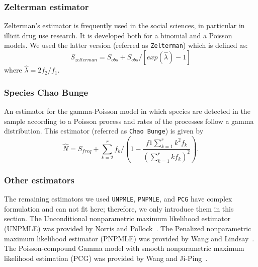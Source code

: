 \documentclass[sigconf,review,anonymous]{acmart}
\newcommand{\Zelterman}{Zelterman\xspace}
\newcommand{\ChaoBunge}{Chao Bunge\xspace}
\newcounter{todocounter}
\newcommand{\todo}[1]{\marginpar{$|$}\textcolor{red}{\stepcounter{todocounter}\footnote[\thetodocounter]{\textcolor{red}{\textbf{TODO }}\textit{#1}}}}
\def\<#1>{\texttt{#1}}
\renewcommand{\todo}[1]{}
\begin{document}
\subsubsection{\Zelterman estimator~\cite{bohning2010some}}
Zelterman's estimator is frequently used in the social sciences, in particular in illicit drug use research.
It is developed both for a binomial and a Poisson models.
We used the latter version (referred as \<Zelterman>) which is defined as:
\begin{displaymath}
    S_{zelterman} = S_{obs} + S_{obs}/[exp(\hat{\lambda}) - 1]
\end{displaymath}
where $\hat{\lambda} = 2f_2/f_1$.


\subsubsection{Species \ChaoBunge~\cite{chao2002estimating}}
An estimator 
for the gamma-Poisson model in which species are detected in the sample
according to a Poisson process and rates of the processes follow a gamma distribution.
%
This estimator (referred as \<\ChaoBunge>) %
is given by
\begin{displaymath}
  \hat{N} = S_{freq} + \sum_{k=2}^{r} f_k/(1 - \frac{f1 \sum_{k=1}^r k^2 f_{k}}{(\sum_{k=1}^r k f_{k})^2}).
\end{displaymath} %



\subsubsection{Other estimators}
The remaining estimators we used \<UNPMLE>, \<PNPMLE>, and \<PCG>
have complex formulation and can not fit here;
therefore, we only introduce them in this section.
%
The Unconditional nonparametric maximum likelihood estimator (UNPMLE)
was provided by Norris and Pollock~\cite{norris1998non}.
%
The Penalized nonparametric maximum likelihood estimator (PNPMLE)
was provided by Wang and Lindsay~\cite{wang2005penalized}.
%
The Poisson-compound Gamma model with smooth nonparametric maximum likelihood estimation (PCG)
was provided by Wang and Ji-Ping~\cite{wang2010estimating}.
\end{document}
